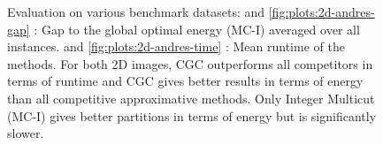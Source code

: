 \begin{center}
\begin{figure}
%
\caption[Evaluation of CGC on 2D datasets]{%
Evaluation on various benchmark datasets:
 and \cref{fig:plots:2d-andres-gap} :
Gap to the global optimal energy (MC-I) averaged over all instances.
 and \cref{fig:plots:2d-andres-time} :
Mean runtime of the methods.
For both 2D images,
CGC outperforms all competitors in terms of runtime and CGC gives better results in
terms of energy than all competitive approximative methods.
Only Integer Multicut (MC-I) gives better partitions in terms of energy but is
significantly slower.
}

\end{figure}
\end{center}




